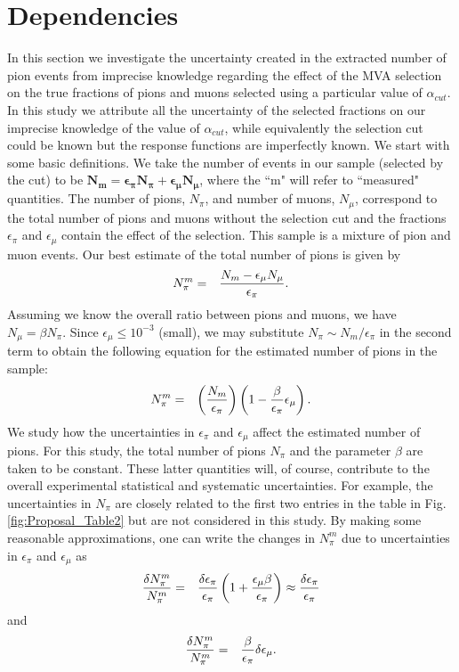 \documentclass[12pt]{article}
\begin{document}
\section{Dependencies}
In this section we investigate the uncertainty created in the extracted number of pion events from imprecise knowledge regarding the effect of the MVA selection on the true fractions of pions and muons selected using a particular value of $\alpha_{cut}$. In this study we attribute all the uncertainty of the selected fractions on our imprecise knowledge of the value of $\alpha_{cut}$, while equivalently the selection cut could be known but the response functions are imperfectly known. 
We start with some basic definitions. We take the number of events in our sample (selected by the cut) to be $\mathbf{ N_m  =  \epsilon_\pi N_\pi + \epsilon_\mu N_\mu}$, where the ``m" will refer to ``measured" quantities.  The number of pions, $N_\pi$, and number of muons, $N_\mu$, correspond to the total number of pions and muons without the selection cut and the fractions $\epsilon_\pi$ and $\epsilon_\mu$ contain the effect of the selection. This sample is a mixture of pion and muon events. Our best estimate of the total number of pions is given by 
\begin{eqnarray}
N_\pi^m & = & {N_m - \epsilon_\mu N_\mu \over \epsilon_\pi}.
\end{eqnarray}
Assuming we know the overall ratio between pions and muons, we have $N_\mu  =  \beta N_\pi$.
Since $\epsilon_\mu \leq 10^{-3}$ (small), we may substitute $N_\pi \sim N_m/\epsilon_\pi$ in the second term to obtain the following equation for the estimated number of pions in the sample:
\begin{eqnarray}
N_\pi^m & = & \left(N_m \over \epsilon_\pi \right) \left(1 - { \beta \over \epsilon_\pi} \epsilon_\mu \right).   \label{eq:npi_m}
\end{eqnarray}
We study how the uncertainties in $\epsilon_\pi$ and $\epsilon_\mu$ affect the estimated number of pions. For this study, the total number of pions $N_\pi$ and the parameter $\beta$ are taken to be constant. These latter quantities will, of course, contribute to the overall experimental statistical and systematic uncertainties. For example, the uncertainties in $N_\pi$ are closely related to the first two entries in the table in Fig.\,\ref{fig:Proposal_Table2} but are not considered in this study.
By making some reasonable approximations, one can write the changes in $N_\pi^m$ due to uncertainties in $\epsilon_\pi$ and $\epsilon_\mu$ as 
\begin{eqnarray}
\delta N_\pi^m \over N_\pi^m & = & {\delta \epsilon_\pi \over \epsilon_\pi} \left( 1 + {\epsilon_\mu \beta \over \epsilon_\pi} \right)
\approx {\delta \epsilon_\pi \over \epsilon_\pi}     \label{eq:delta_pi}
\end{eqnarray}
and
\begin{eqnarray}
\delta N_\pi^m \over N_\pi^m  & = & {\beta \over \epsilon_\pi} \delta \epsilon_\mu .     \label{eq:delta_mu}
\end{eqnarray}
\end{document}
